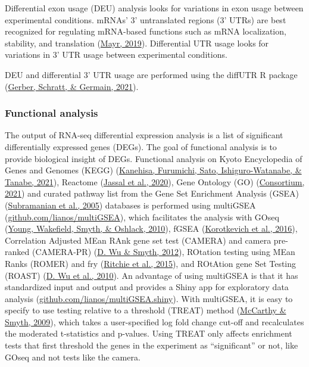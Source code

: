 \documentclass[12pt,twoside]{reedthesis}
\begin{document}
Differential exon usage (DEU) analysis looks for variations in exon
usage between experimental conditions. mRNAs' 3' untranslated regions
(3' UTRs) are best recognized for regulating mRNA-based functions such
as mRNA localization, stability, and translation (\protect\hyperlink{ref-mayr2019}{Mayr, 2019}).
Differential UTR usage looks for variations in 3' UTR usage between
experimental conditions.

DEU and differential 3' UTR usage are performed using the diffUTR R
package (\protect\hyperlink{ref-gerber2021}{Gerber, Schratt, \& Germain, 2021}).

\hypertarget{m3.2.7}{%
\subsubsection*{Functional analysis}\label{m3.2.7}}

The output of RNA-seq differential expression analysis is a list of
significant differentially expressed genes (DEGs). The goal of
functional analysis is to provide biological insight of DEGs. Functional
analysis on Kyoto Encyclopedia of Genes and Genomes (KEGG)
(\protect\hyperlink{ref-kanehisa2021}{Kanehisa, Furumichi, Sato, Ishiguro-Watanabe, \& Tanabe, 2021}), Reactome (\protect\hyperlink{ref-jassal2020}{Jassal et al., 2020}), Gene Ontology (GO)
(\protect\hyperlink{ref-consortium2021}{Consortium, 2021}) and curated pathway list from the Gene Set Enrichment
Analysis (GSEA) (\protect\hyperlink{ref-subramanian2005}{Subramanian et al., 2005}) databases is performed using
multiGSEA (\href{https://github.com/lianos/multiGSEA}{github.com/lianos/multiGSEA}), which facilitates the
analysis with GOseq (\protect\hyperlink{ref-young2010}{Young, Wakefield, Smyth, \& Oshlack, 2010}), fGSEA (\protect\hyperlink{ref-korotkevich2016}{Korotkevich et al., 2016}), Correlation
Adjusted MEan RAnk gene set test (CAMERA) and camera pre-ranked
(CAMERA-PR) (\protect\hyperlink{ref-wu2012}{D. Wu \& Smyth, 2012}), ROtation testing using MEan Ranks (ROMER) and fry
(\protect\hyperlink{ref-ritchie2015}{Ritchie et al., 2015}), and ROtAtion gene Set Testing (ROAST) (\protect\hyperlink{ref-wu2010}{D. Wu et al., 2010}). An
advantage of using multiGSEA is that it has standardized input and
output and provides a Shiny app for exploratory data analysis (\href{https://github.com/lianos/multiGSEA.shiny}{github.com/lianos/multiGSEA.shiny}). With multiGSEA, it is
easy to specify to use testing relative to a threshold (TREAT) method
(\protect\hyperlink{ref-mccarthy2009}{McCarthy \& Smyth, 2009}), which takes a user-specified log fold change cut-off
and recalculates the moderated t-statistics and p-values. Using TREAT
only affects enrichment tests that first threshold the genes in the
experiment as ``significant'' or not, like GOseq and not tests like the
camera.
\end{document}

